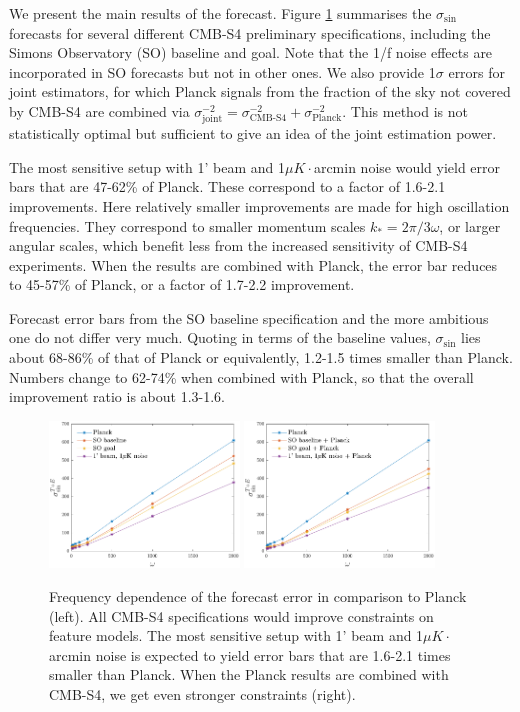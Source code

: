 We present the main results of the forecast. Figure \ref{forecast omega dependence pol} summarises the $\sigma_{\sin}$ forecasts for several different CMB-S4 preliminary specifications, including the Simons Observatory (SO) baseline and goal. Note that the 1/f noise effects are incorporated in SO forecasts but not in other ones. We also provide 1$\sigma$ errors for joint estimators, for which Planck signals from the fraction of the sky not covered by CMB-S4 are combined via $\sigma_\text{joint}^{-2} = \sigma_\text{CMB-S4}^{-2} +  \sigma_\text{Planck}^{-2}$. This method is not statistically optimal but sufficient to give an idea of the joint estimation power.

The most sensitive setup with 1' beam and 1$\mu K \cdot$arcmin noise would yield error bars that are 47-62\% of Planck. These correspond to a factor of 1.6-2.1 improvements. Here relatively smaller improvements are made for high oscillation frequencies. They correspond to smaller momentum scales $k_\ast = 2\pi/3\omega$, or larger angular scales, which benefit less from the increased sensitivity of CMB-S4 experiments. When the results are combined with Planck, the error bar reduces to 45-57\% of Planck, or a factor of 1.7-2.2 improvement.

Forecast error bars from the SO baseline specification and the more ambitious one do not differ very much. Quoting in terms of the baseline values, $\sigma_{\sin}$ lies about 68-86\% of that of Planck or equivalently, 1.2-1.5 times smaller than Planck. Numbers change to 62-74\% when combined with Planck, so that the overall improvement ratio is about 1.3-1.6.

\begin{figure}[ht]
	\includegraphics[width=0.45\textwidth]{omega_dependence_pol.pdf}
	\includegraphics[width=0.45\textwidth]{omega_dependence_combined_pol.pdf}
	\caption{Frequency dependence of the forecast error in comparison to Planck (left). All CMB-S4 specifications would improve constraints on feature models. The most sensitive setup with 1' beam and 1$\mu K \cdot$arcmin noise is expected to yield error bars that are 1.6-2.1 times smaller than Planck. When the Planck results are combined with CMB-S4, we get even stronger constraints (right).}
	\label{forecast omega dependence pol}
\end{figure}

